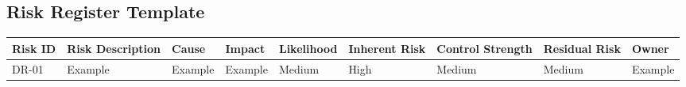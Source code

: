 \documentclass[
  letterpaper,
  DIV=11,
  numbers=noendperiod]{scrartcl}
\begin{document}
\subsection{Risk Register Template}\label{risk-register-template}

\begin{longtable}[]{@{}
  >{\raggedright\arraybackslash}p{}
  >{\raggedright\arraybackslash}p{}
  >{\raggedright\arraybackslash}p{}
  >{\raggedright\arraybackslash}p{}
  >{\raggedright\arraybackslash}p{}
  >{\raggedright\arraybackslash}p{}
  >{\raggedright\arraybackslash}p{}
  >{\raggedright\arraybackslash}p{}
  >{\raggedright\arraybackslash}p{}@{}}
\toprule\noalign{}
\begin{minipage}[b]{\linewidth}\raggedright
Risk ID
\end{minipage} & \begin{minipage}[b]{\linewidth}\raggedright
Risk Description
\end{minipage} & \begin{minipage}[b]{\linewidth}\raggedright
Cause
\end{minipage} & \begin{minipage}[b]{\linewidth}\raggedright
Impact
\end{minipage} & \begin{minipage}[b]{\linewidth}\raggedright
Likelihood
\end{minipage} & \begin{minipage}[b]{\linewidth}\raggedright
Inherent Risk
\end{minipage} & \begin{minipage}[b]{\linewidth}\raggedright
Control Strength
\end{minipage} & \begin{minipage}[b]{\linewidth}\raggedright
Residual Risk
\end{minipage} & \begin{minipage}[b]{\linewidth}\raggedright
Owner
\end{minipage} \\
\midrule\noalign{}
\endhead
\bottomrule\noalign{}
\endlastfoot
DR-01 & Example & Example & Example & Medium & High & Medium & Medium &
Example \\
\end{longtable}
\end{document}
